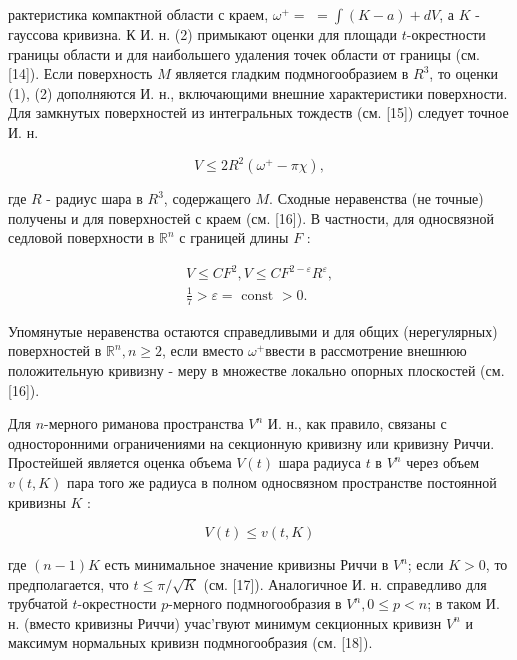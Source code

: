 \documentclass[10pt]{article}
\begin{document}
рактеристика компактной области с краем, $\omega^{+}=$ $=\int(K-a)+d V$, а $K$ - гауссова кривизна. К И. н. (2) примыкают оценки для площади $t$-окрестности границы области и для наибольшего удаления точек области от границы (см. [14]). Если поверхность $M$ является гладким подмногообразием в $R^{3}$, то оценки (1), (2) дополняются И. н., включающими внешние характеристики поверхности. Для замкнутых поверхностей из интегральных тождеств (см. [15]) следует точное И. н.



\[

V \leqslant 2 R^{2}\left(\omega^{+}-\pi \chi\right),

\]



где $R$ - радиус шара в $R^{3}$, содержащего $M$. Сходные неравенства (не точные) получены и для поверхностей с краем (см. [16]). В частности, для односвязной седловой поверхности в $\mathbb{R}^{n}$ с границей длины $F$ :



\[

\begin{gathered}

V \leqslant C F^{2}, V \leqslant C F^{2-\varepsilon} R^{\varepsilon}, \\

\frac{1}{7}>\varepsilon=\text { const }>0 .

\end{gathered}

\]



Упомянутые неравенства остаются справедливыми и для общих (нерегулярных) поверхностей в $\mathbb{R}^{n}, n \geqslant 2$, если вместо $\omega^{+}$ввести в рассмотрение внешнюю положительную кривизну - меру в множестве локально опорных плоскостей (см. [16]).



Для $n$-мерного риманова пространства $V^{n}$ И. н., как правило, связаны с односторонними ограничениями на секционную кривизну или кривизну Риччи. Простейшей является оценка объема $V(t)$ шара радиуса $t$ в $V^{n}$ через объем $v(t, K)$ пара того же радиуса в полном односвязном пространстве постоянной кривизны $K$ :



\[

V(t) \leqslant v(t, K)

\]



где $(n-1) K$ есть минимальное значение кривизны Риччи в $V^{n}$; если $K>0$, то предполагается, что $t \leqslant \pi / \sqrt{K}$ (см. [17]). Аналогичное И. н. справедливо для трубчатой $t$-окрестности $p$-мерного подмногообразия в $V^{n}, 0 \leqslant p<n$; в таком И. н. (вместо кривизны Риччи) учас'гвуют минимум секционных кривизн $V^{n}$ и максимум нормальных кривизн подмногообразия (см. [18]).
\end{document}

